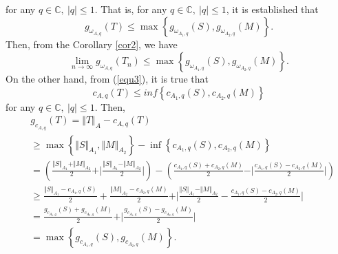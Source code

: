 \documentclass[preprint,12pt,3p]{elsarticle}
\begin{document}
for any $ q\in \mathbb{C}, \ \vert q \vert \leq 1. $
That is, for any $ q\in \mathbb{C}, \ \vert q \vert \leq 1 $, it is established that 
$$
g_{\omega_{A,q}}(T) \leq \max \left\lbrace g_{\omega_{A_{1},q}}(S),g_{\omega_{A_{2},q}}(M)  \right\rbrace .
$$
Then, from the Corollary \ref{cor2}, we have
$$
\lim\limits_{n\rightarrow \infty}g_{\omega_{A,q}}(T_{n}) \leq \max \left\lbrace g_{\omega_{A_{1},q}}(S),g_{\omega_{A_{2},q}}(M)  \right\rbrace .
$$
On the other hand, from (\ref{equ3}), it is true that
$$
c_{{A,q}}(T) \leq inf \left\lbrace c_{{A_{1},q}}(S),c_{{A_{2},q}}(M)  \right\rbrace 
$$
for any $ q\in \mathbb{C}, \ \vert q \vert \leq 1. $ Then,
\begin{align}
   & g_{c_{A,q}}(T)  =  \Vert T \Vert_{A}-c_{A,q}(T)\nonumber \\
& \geq  \max \left\lbrace \Vert S \Vert_{A_{1}}, \Vert M \Vert_{A_{2}} \right\rbrace - \inf \left\lbrace c_{A_{1},q}(S), c_{A_{2},q}(M) \right\rbrace  \nonumber \\
& =  \left( \frac{\Vert S \Vert_{A_{1}}+\Vert M \Vert_{A_{2}}}{2} + \vert \frac{\Vert S \Vert_{A_{1}}-\Vert M \Vert_{A_{2}}}{2} \vert \right) - \left( \frac{c_{A_{1},q}(S)+ c_{A_{2},q}(M)}{2} - \vert \frac{c_{A_{1},q}(S)- c_{A_{2},q}(M)}{2} \vert \right) \nonumber \\
& \geq  \frac{\Vert S \Vert_{A_{1}} - c_{A_{1},q}(S)}{2}+ \frac{\Vert M \Vert_{A_{2}} - c_{A_{2},q}(M)}{2}+ \vert  \frac{\Vert S \Vert_{A_{1}}-\Vert M \Vert_{A_{2}}}{2} - \frac{c_{A_{1},q}(S)- c_{A_{2},q}(M)}{2} \vert \nonumber \\
& =  \frac{g_{c_{A_{1},q}}(S)+g_{c_{A_{2},q}}(M)}{2} + \vert \frac{g_{c_{A_{1},q}}(S)-g_{c_{A_{2},q}}(M)}{2} \vert \nonumber \\
& =  \max \left\lbrace g_{c_{A_{1},q}}(S),g_{c_{A_{2},q}}(M)  \right\rbrace  \nonumber .
\end{align}
\end{document}

